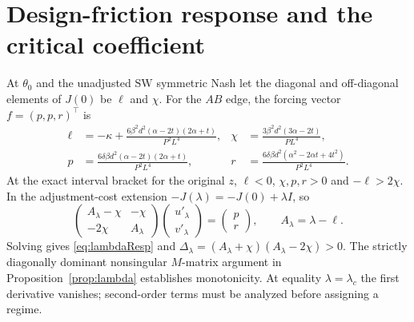 \documentclass[11pt,a4paper]{article}
\theoremstyle{remark}\newtheorem{remark}[theorem]{Remark}
\newcommand{\SW}{\mathrm{SW}}\newcommand{\SU}{\mathrm{SU}}\newcommand{\IS}{\mathrm{IS}}
\begin{document}
\section{Design-friction response and the critical coefficient}\label{app:lambda}
At $\theta_0$ and the unadjusted $\SW$ symmetric Nash let the diagonal and off-diagonal elements of $J(0)$ be $\ell$ and $\chi$. For the $AB$ edge, the forcing vector $f=(p,p,r)^{\top}$ is
\begin{align}
\ell&=-\kappa+\frac{6\beta^2d^2(\alpha-2t)(2\alpha+t)}{P^2L^4},
&\chi&=\frac{3\beta^2d^2(3\alpha-2t)}{PL^4},\\
p&=\frac{6\delta\beta d^2(\alpha-2t)(2\alpha+t)}{P^2L^4},
&r&=\frac{6\delta\beta d^2(\alpha^2-2\alpha t+4t^2)}{P^2L^4}.
\end{align}
At the exact interval bracket for the original $z$, $\ell<0$, $\chi,p,r>0$ and $-\ell>2\chi$. In the adjustment-cost extension $-J(\lambda)=-J(0)+\lambda I$, so
\[
\begin{pmatrix} A_\lambda-\chi &-\chi\\ -2\chi&A_\lambda\end{pmatrix}
\begin{pmatrix}u'_\lambda\\v'_\lambda\end{pmatrix}=
\begin{pmatrix}p\\r\end{pmatrix},\qquad A_\lambda=\lambda-\ell.
\]
Solving gives \eqref{eq:lambdaResp} and $\Delta_\lambda=(A_\lambda+\chi)(A_\lambda-2\chi)>0$. The strictly diagonally dominant nonsingular $M$-matrix argument in Proposition~\ref{prop:lambda} establishes monotonicity. At equality $\lambda=\lambda_c$ the first derivative vanishes; second-order terms must be analyzed before assigning a regime.
\end{document}
